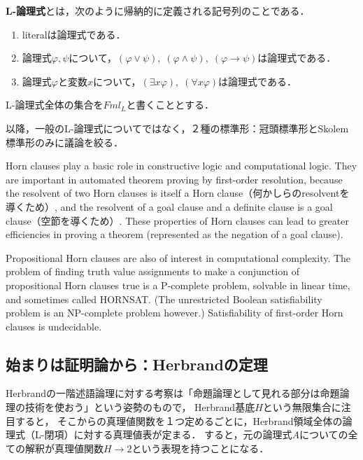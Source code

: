 \documentclass[uplatex, 12pt, dvipdfmx]{jsreport}
\begin{document}
\begin{definition}[formula]
    \textbf{L-論理式}とは，次のように帰納的に定義される記号列のことである．
    \begin{enumerate}
        \item literalは論理式である．
        \item 論理式$\varphi,\psi$について，$(\varphi\lor\psi),\;(\varphi\land\psi),\;(\varphi\to\psi)$は論理式である．
        \item 論理式$\varphi$と変数$x$について，$(\exists x\varphi),\;(\forall x\varphi)$は論理式である．
    \end{enumerate}
    L-論理式全体の集合を$Fml_L$と書くこととする．
\end{definition}

以降，一般のL-論理式についてではなく，２種の標準形：冠頭標準形とSkolem標準形のみに議論を絞る．

\begin{application}
    Horn clauses play a basic role in constructive logic and computational logic. They are important in automated theorem proving by first-order resolution, because the resolvent of two Horn clauses is itself a Horn clause（何かしらのresolventを導くため）, and the resolvent of a goal clause and a definite clause is a goal clause（空節を導くため）. These properties of Horn clauses can lead to greater efficiencies in proving a theorem (represented as the negation of a goal clause).


    Propositional Horn clauses are also of interest in computational complexity. The problem of finding truth value assignments to make a conjunction of propositional Horn clauses true is a P-complete problem, solvable in linear time, and sometimes called HORNSAT. (The unrestricted Boolean satisfiability problem is an NP-complete problem however.) Satisfiability of first-order Horn clauses is undecidable.
\end{application}

\subsection{始まりは証明論から：Herbrandの定理}\label{subsection-Herbrand}

Herbrandの一階述語論理に対する考察は「命題論理として見れる部分は命題論理の技術を使おう」という姿勢のもので，
Herbrand基底$H$という無限集合に注目すると，
そこからの真理値関数を１つ定めるごとに，Herbrand領域全体の論理式（L-閉項）に対する真理値表が定まる．
すると，元の論理式$A$についての全ての解釈が真理値関数$H\to 2$という表現を持つことになる．
\end{document}
